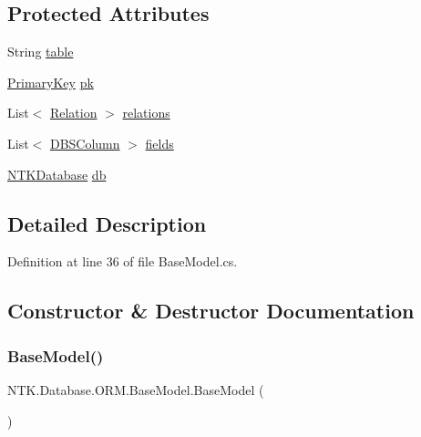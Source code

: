 \subsection*{Protected Attributes}
\begin{DoxyCompactItemize}
\item 
String \mbox{\hyperlink{class_n_t_k_1_1_database_1_1_o_r_m_1_1_base_model_afcf18c824f83a0d998e3cd3fbbbf18ca}{table}}
\item 
\mbox{\hyperlink{class_n_t_k_1_1_database_1_1_o_r_m_1_1_primary_key}{Primary\+Key}} \mbox{\hyperlink{class_n_t_k_1_1_database_1_1_o_r_m_1_1_base_model_ae91649682c0969735cbd9b897160a97a}{pk}}
\item 
List$<$ \mbox{\hyperlink{class_n_t_k_1_1_database_1_1_o_r_m_1_1_relation}{Relation}} $>$ \mbox{\hyperlink{class_n_t_k_1_1_database_1_1_o_r_m_1_1_base_model_a9eb1dab4f5bee3bbea414ffc19e5fbbc}{relations}}
\item 
List$<$ \mbox{\hyperlink{class_n_t_k_1_1_database_1_1_d_b_s_column}{D\+B\+S\+Column}} $>$ \mbox{\hyperlink{class_n_t_k_1_1_database_1_1_o_r_m_1_1_base_model_add7958e53601b80ab0b4892c4169d9fd}{fields}}
\item 
\mbox{\hyperlink{class_n_t_k_1_1_database_1_1_n_t_k_database}{N\+T\+K\+Database}} \mbox{\hyperlink{class_n_t_k_1_1_database_1_1_o_r_m_1_1_base_model_a6a7d6eaf7ae1fd93a652c835b3907398}{db}}
\end{DoxyCompactItemize}


\subsection{Detailed Description}




Definition at line 36 of file Base\+Model.\+cs.



\subsection{Constructor \& Destructor Documentation}
\mbox{\label{class_n_t_k_1_1_database_1_1_o_r_m_1_1_base_model_a17abd002e7bda84ef89d04f5dc222fe6}} 
\subsubsection{\texorpdfstring{BaseModel()}{BaseModel()}}
{\footnotesize\ttfamily N\+T\+K.\+Database.\+O\+R\+M.\+Base\+Model.\+Base\+Model (\begin{DoxyParamCaption}{ }\end{DoxyParamCaption})}







